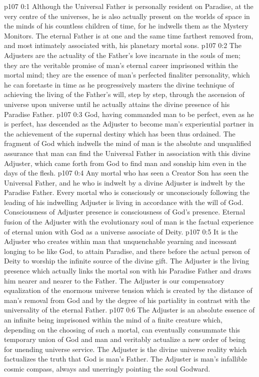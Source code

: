 \author{Solitary Messenger}
\vs p107 0:1 Although the Universal Father is personally resident on Paradise, at the very centre of the universes, he is also actually present on the worlds of space in the minds of his countless children of time, for he indwells them as the Mystery Monitors. The eternal Father is at one and the same time farthest removed from, and most intimately associated with, his planetary mortal sons.
\vs p107 0:2 The Adjusters are the actuality of the Father’s love incarnate in the souls of men; they are the veritable promise of man’s eternal career imprisoned within the mortal mind; they are the essence of man’s perfected finaliter personality, which he can foretaste in time as he progressively masters the divine technique of achieving the living of the Father’s will, step by step, through the ascension of universe upon universe until he actually attains the divine presence of his Paradise Father.
\vs p107 0:3 God, having commanded man to be perfect, even as he is perfect, has descended as the Adjuster to become man’s experiential partner in the achievement of the supernal destiny which has been thus ordained. The fragment of God which indwells the mind of man is the absolute and unqualified assurance that man can find the Universal Father in association with this divine Adjuster, which came forth from God to find man and sonship him even in the days of the flesh.
\vs p107 0:4 Any mortal who has seen a Creator Son has seen the Universal Father, and he who is indwelt by a divine Adjuster is indwelt by the Paradise Father. Every mortal who is consciously or unconsciously following the leading of his indwelling Adjuster is living in accordance with the will of God. Consciousness of Adjuster presence is consciousness of God’s presence. Eternal fusion of the Adjuster with the evolutionary soul of man is the factual experience of eternal union with God as a universe associate of Deity.
\vs p107 0:5 It is the Adjuster who creates within man that unquenchable yearning and incessant longing to be like God, to attain Paradise, and there before the actual person of Deity to worship the infinite source of the divine gift. The Adjuster is the living presence which actually links the mortal son with his Paradise Father and draws him nearer and nearer to the Father. The Adjuster is our compensatory equalization of the enormous universe tension which is created by the distance of man’s removal from God and by the degree of his partiality in contrast with the universality of the eternal Father.
\vs p107 0:6 The Adjuster is an absolute essence of an infinite being imprisoned within the mind of a finite creature which, depending on the choosing of such a mortal, can eventually consummate this temporary union of God and man and veritably actualize a new order of being for unending universe service. The Adjuster is the divine universe reality which factualizes the truth that God is man’s Father. The Adjuster is man’s infallible cosmic compass, always and unerringly pointing the soul Godward.
